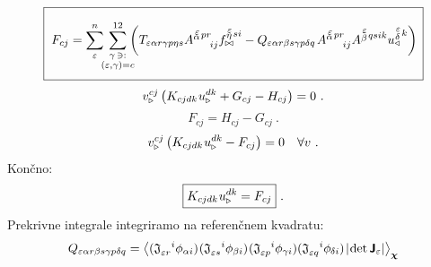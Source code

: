 \vspace{1mm}
\begin{equation}
   \boxed{ \phantom{\rule[-9mm]{1mm}{18mm}}
   F_{c j} =
   \sum^n_\varepsilon
   \mkern-7mu
   \sum_{\substack{\gamma \, \ni: \\
      (\varepsilon,\gamma) = c}}^{12}
   \mkern-10mu
   \qty(
   T_{\varepsilon   \alpha r   \gamma p   \eta s}
   A^{\substack{\mkern2mu \varepsilon \\[-0.65mm] \alpha} \mkern2mu p r}_{\mkern29mu i j}
   f^{\substack{\mkern2mu \varepsilon \\[-0.59mm] \eta} \mkern2mu s i}_{\bowtie}
   -
   Q_{\varepsilon   \alpha r   \beta s   \gamma p   \delta q} \mkern2mu
   A^{\substack{\mkern2mu \varepsilon \\[-0.65mm] \alpha} \mkern2mu p r}_{\mkern29mu i j}
   A^{\substack{\mkern2mu \varepsilon \\[0.05mm] \beta} \mkern2mu q s i k}
   u^{\substack{\mkern2mu \varepsilon \\[0.09mm] \delta} \mkern2mu k}_\triangleleft ) \mkern3mu }
\end{equation}
\begin{equation*}
   v^{c j}_{\triangleright} \left(
   K_{c j d k} \mkern1mu u^{d k}_\triangleright
   +
   G_{c j}
   -
   H_{c j}
   \right) = 0 \ .
\end{equation*}
\begin{equation*}
   F_{c j} = H_{c j} - G_{c j} \ .
\end{equation*}
\begin{equation*}
   v^{c j}_{\triangleright} \left(
   K_{c j d k} \mkern1mu u^{d k}_\triangleright
   -
   F_{c j}
   \right) = 0 \quad \forall v \ .
\end{equation*}
Končno:
\begin{equation}
   \boxed{
   K_{c j d k} \mkern1mu u^{d k}_\triangleright
   =
   F_{c j} } \ .
\end{equation}
Prekrivne integrale integriramo na referenčnem kvadratu:
\begin{equation}
   Q_{\varepsilon  \alpha r \beta s \gamma p \delta q}
   =
   \expval{
      ( \mathfrak{J}_{\varepsilon r}^{\mkern18mu i} \phi_{\alpha i}) \mkern1mu
      ( \mathfrak{J}_{\varepsilon s}^{\mkern18mu i} \phi_{\beta i} ) \mkern1mu
      ( \mathfrak{J}_{\varepsilon p}^{\mkern18mu i} \phi_{\gamma i})
      ( \mathfrak{J}_{\varepsilon q}^{\mkern18mu i} \phi_{\mkern-1mu \delta i} ) \mkern2mu
      |\mkern-2mu \det \bm{\mathsf{J}}_\varepsilon | }_{\bm{\chi}}
\end{equation}
